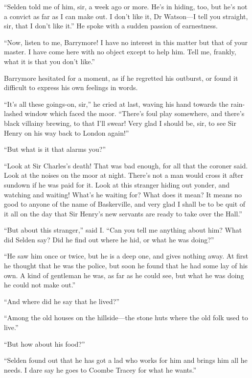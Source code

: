 \enquote{Selden told me of him, sir, a week ago or more. He's in hiding, too, but he's not a convict as far as I can make out. I don't like it, Dr Watson---I tell you straight, sir, that I don't like it.} He spoke with a sudden passion of earnestness.

\enquote{Now, listen to me, Barrymore! I have no interest in this matter but that of your master. I have come here with no object except to help him. Tell me, frankly, what it is that you don't like.}

Barrymore hesitated for a moment, as if he regretted his outburst, or found it difficult to express his own feelings in words.

\enquote{It's all these goings-on, sir,} he cried at last, waving his hand towards the rain-lashed window which faced the moor. \enquote{There's foul play somewhere, and there's black villainy brewing, to that I'll swear! Very glad I should be, sir, to see Sir Henry on his way back to London again!}

\enquote{But what is it that alarms you?}

\enquote{Look at Sir Charles's death! That was bad enough, for all that the coroner said. Look at the noises on the moor at night. There's not a man would cross it after sundown if he was paid for it. Look at this stranger hiding out yonder, and watching and waiting! What's he waiting for? What does it mean? It means no good to anyone of the name of Baskerville, and very glad I shall be to be quit of it all on the day that Sir Henry's new servants are ready to take over the Hall.}

\enquote{But about this stranger,} said I. \enquote{Can you tell me anything about him? What did Selden say? Did he find out where he hid, or what he was doing?}

\enquote{He saw him once or twice, but he is a deep one, and gives nothing away. At first he thought that he was the police, but soon he found that he had some lay of his own. A kind of gentleman he was, as far as he could see, but what he was doing he could not make out.}

\enquote{And where did he say that he lived?}

\enquote{Among the old houses on the hillside---the stone huts where the old folk used to live.}

\enquote{But how about his food?}

\enquote{Selden found out that he has got a lad who works for him and brings him all he needs. I dare say he goes to Coombe Tracey for what he wants.}


